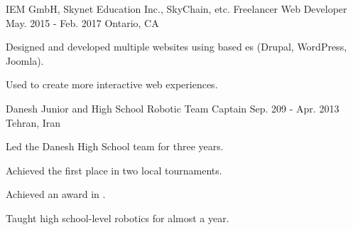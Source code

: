 

\begin{cventries}

    \cventry
    {IEM GmbH, Skynet Education Inc., SkyChain, etc.} %
    {Freelancer Web Developer} %
    {May. 2015 - Feb. 2017} %
    {Ontario, CA} %
    {
      \begin{cvitems} %
        \item {Designed and developed multiple websites using  based es (Drupal, WordPress, Joomla).}
          \begin{cvsubitems}
            \item {Used  to create more interactive web experiences.}
          \end{cvsubitems}
      \end{cvitems}
    }

      \cventry
        {Danesh Junior and High School} %
        {Robotic Team Captain} %
        {Sep. 209 - Apr. 2013} %
        {Tehran, Iran} %
        {
          \begin{cvitems} %
            \item {Led the Danesh High School team for three years.}
              \begin{cvsubitems}
                \item {Achieved the first place in two local tournaments.}
                \item {Achieved an award in .}
                \item {Taught high school-level robotics for almost a year.}
              \end{cvsubitems}
          \end{cvitems}
        }

\end{cventries}
